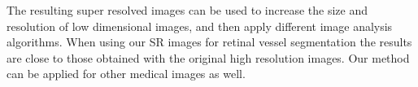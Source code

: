 \documentclass{llncs}
\begin{document}
% 
The resulting super resolved images can be used to increase the size and resolution of low dimensional images, and then apply different image analysis algorithms. When using our SR images for retinal vessel segmentation the results are close to those obtained with the original high resolution images. Our method can be applied for other medical images as well.









\end{document}
